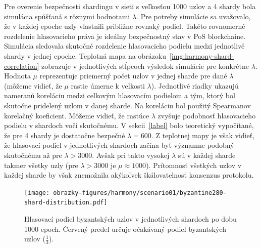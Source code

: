 Pre overenie bezpečnosti shardingu v sieti s veľkosťou 1000 uzlov a 4 shardy bola simulácia spúšťaná s rôznymi hodnotami $\lambda$. Pre potreby simulácie sa uvažovalo, že v každej epoche uzly vlastnili približne rovnaký podiel. Takéto rovnomerné rozdelenie hlasovacieho práva je ideálny bezpečnostný stav v PoS blockchaine. Simulácia sledovala skutočné rozdelenie hlasovacieho podielu medzi jednotlivé shardy v jednej epoche. Teplotná mapa na obrázoku~\ref{img:harmony-shard-correlation} zobrazuje v jednotlivých stĺpcoch výsledok simulácie pre konkrétne $\lambda$. Hodnota $\mu$ reprezentuje priemerný počet uzlov v jednej sharde pre dané $\lambda$ (môžeme vidieť, že $\mu$ rastie úmerne k veľkosti $\lambda$). Jednotlivé riadky ukazujú nameranú koreláciu medzi celkovým hlasovacím podielom a tým, ktorý bol skutočne pridelený uzlom v danej sharde. Na koreláciu bol použitý Spearmanov korelačný koeficient. Môžeme vidieť, že rastúce $\lambda$ zvyšuje podobnosť hlasovacieho podielu v shardoch voči skutočnému. V sekcii~\ref{label} bolo teoretický vypočítané, že pre 4 shardy je dostatočne bezpečné $\lambda=600$. Z teplotnej mapy je však vidieť, že hlasovací podiel v jednotlivých shardoch začína byť významne podobný skutočnému až pre $\lambda > 3000$. Avšak pri takto vysokej $\lambda$ sú v každej sharde takmer všetky uzly (pre $\lambda > 3000$ je $\mu \approx 1000$). Prítomnosť všetkých uzlov v každej sharde by však znemožnila akýkoľvek škálovatelnosť konsenzus protokolu.

\begin{figure}[H]
	\centering
	\texttt{[image: obrazky-figures/harmony/scenario01/byzantine280-shard-distribution.pdf]}
	\caption{Hlasovací podiel byzantských uzlov v jednotlivých shardoch po dobu 1000 epoch. Červený predel určuje očakávaný podiel byzantských uzlov ($\frac{1}{3}$).}
	\label{img:harmony-byzantine-shard-distribution}
\end{figure}

